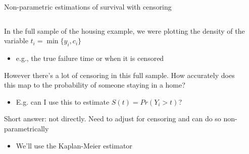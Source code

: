 \documentclass[notes,11pt, aspectratio=169]{beamer}
\newenvironment{wideitemize}{\itemize\addtolength{\itemsep}{10pt}}{\enditemize}
\begin{document}
\begin{frame}{Non-parametric estimations of survival with censoring}
  \begin{columns}[T] %
    \begin{column}{.5\textwidth}
  \begin{wideitemize}
  \item<1-> In the full sample of the housing example, we were plotting the density of the
    variable $t_{i} = \min\{y_{i}, c_{i}\}$ 
  \begin{itemize}
  \item e.g., the true failure time or when it is censored
  \end{itemize}
\item<2-> However there's a lot of censoring in this full sample. How
  accurately does this map to the probability of someone staying in a
  home?
  \begin{itemize}
  \item E.g. can I use this to estimate $S(t) = Pr( Y_{i} > t)$?
  \end{itemize}
\item<2-> Short answer: not directly. Need to adjust for censoring and can do so
  non-parametrically
  \begin{itemize}
  \item We'll use the Kaplan-Meier estimator 
  \end{itemize}
  \end{wideitemize}
    \end{column}%
  \hfill%
  \begin{column}{.5\textwidth}

\end{column}
\end{columns}
\end{frame}
\end{document}
